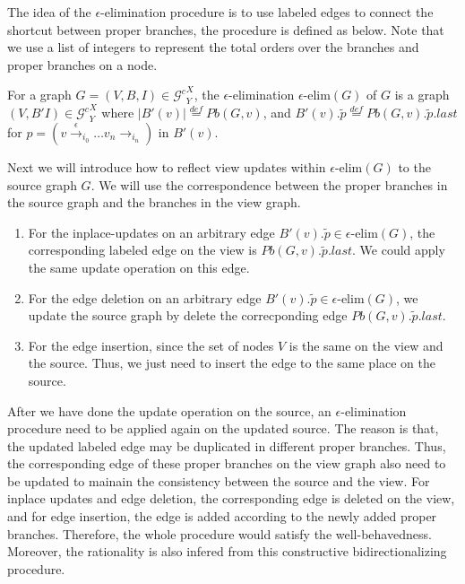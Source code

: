 \documentclass{llncs}
\newcommand{\act}[1]{{\xrightarrow{#1}{}}}
\newcommand{\Gc}{{\mathcal{G}^{c}}}
\begin{document}
The idea of the $\epsilon$-elimination procedure is to use labeled edges to connect the shortcut between proper branches, the procedure is defined as below. Note that we use a list of integers to represent the total orders over the branches and proper branches on a node.

\begin{definition}\label{def-epsilon}
For a graph $G=(V,B,I)\in\Gc^X_Y$, the $\epsilon$-elimination $\epsilon\mbox{-elim}(G)$ of $G$ is a graph $(V,B'I)\in\Gc^X_Y$ where $|B'(v)|\stackrel{def}{=}Pb(G,v)$, and $B'(v).\tilde{p}\stackrel{def}{=}Pb(G,v).\tilde{p}.last$ for $p=(v\act{\epsilon}_{i_0}\ldots v_n\act{}_{i_n})$ in $B'(v)$.
\end{definition}

Next we will introduce how to reflect view updates within $\epsilon\mbox{-elim}(G)$ to the source graph $G$. We will use the correspondence between the proper branches in the source graph and the branches in the view graph.

\begin{enumerate}
	\item For the inplace-updates on an arbitrary edge $B'(v).\tilde{p}\in\epsilon\mbox{-elim}(G)$, the corresponding labeled edge on the view is $Pb(G,v).\tilde{p}.last$. We could apply the same update operation on this edge. 
	\item For the edge deletion on an arbitrary edge $B'(v).\tilde{p}\in\epsilon\mbox{-elim}(G)$, we update the source graph by delete the correcponding edge $Pb(G,v).\tilde{p}.last$.
	\item For the edge insertion, since the set of nodes $V$ is the same on the view and the source. Thus, we just need to insert the edge to the same place on the source.
\end{enumerate}

After we have done the update operation on the source, an $\epsilon$-elimination procedure need to be applied again on the updated source. The reason is that, the updated labeled edge may be duplicated in different proper branches. Thus, the corresponding edge of these proper branches on the view graph also need to be updated to mainain the consistency between the source and the view. For inplace updates and edge deletion, the corresponding edge is deleted on the view, and for edge insertion, the edge is added according to the newly added proper branches. Therefore, the whole procedure would satisfy the well-behavedness. Moreover, the rationality is also infered from this constructive bidirectionalizing procedure.
\end{document}

